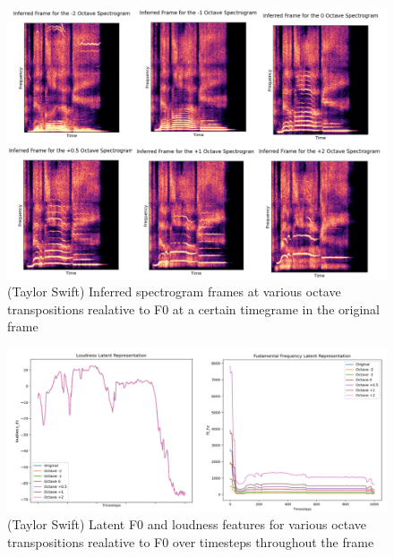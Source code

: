 \begin{figure}[H]
    \centering
    \includegraphics[width=\textwidth]{research/results/TaylorSwift/InferredTranspositions.png}
    \caption{(Taylor Swift) Inferred spectrogram frames at various octave transpositions realative to F0 at a certain timegrame in the original frame}
\end{figure}

\begin{figure}[H]
    \centering
    \includegraphics[width=\textwidth]{research/results/TaylorSwift/InferredTranspositionsGraphs.png}
    \caption{(Taylor Swift) Latent F0 and loudness features for various octave transpositions realative to F0 over timesteps throughout the frame}
\end{figure}

